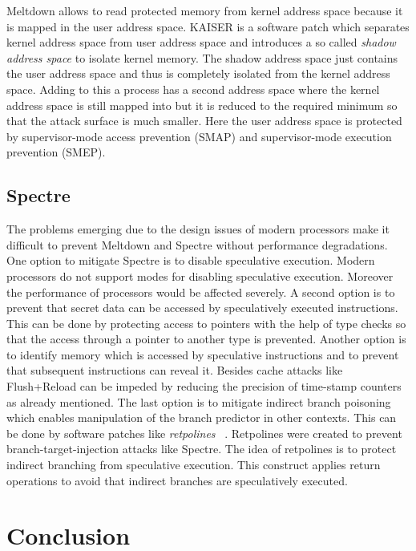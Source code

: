 \documentclass[a4paper,oneside,openright] {scrreprt}
\begin{document}
Meltdown allows to read protected memory from kernel address space because it is mapped in the user address space.
KAISER is a software patch which separates kernel address space from user address space 
and introduces a so called \textit{shadow address space} to isolate kernel memory. 
The shadow address space just contains the user address space and thus is completely isolated from the kernel address space.
Adding to this a process has a second address space where the kernel address space is still mapped into 
but it is reduced to the required minimum so that the attack surface is much smaller. 
Here the user address space is protected by supervisor-mode access prevention (SMAP) 
and supervisor-mode execution prevention (SMEP).

\section{Spectre}
\label{ch:intro:motivation}

The problems emerging due to the design issues of modern processors make it difficult to prevent Meltdown and Spectre 
 without performance degradations.
One option to mitigate Spectre is to disable speculative execution. 
Modern processors do not support modes for disabling speculative execution. 
Moreover the performance of processors would be affected severely.
A second option is to prevent that secret data can be accessed by speculatively executed instructions. 
This can be done by protecting access to pointers with the help of type checks 
so that the access through a pointer to another type is prevented.
Another option is to identify memory which is accessed by speculative instructions and to prevent that subsequent
instructions can reveal it.
Besides cache attacks like Flush+Reload can be impeded by reducing the precision of time-stamp counters as already mentioned.
The last option is to mitigate indirect branch poisoning which enables manipulation of the branch predictor in other contexts.
This can be done by software patches like \textit{retpolines} ~\cite{retpoline}.
Retpolines were created to prevent branch-target-injection attacks like Spectre. 
The idea of retpolines is to protect indirect branching from speculative execution.
This construct applies return operations to avoid that indirect branches are speculatively executed.  

\chapter{Conclusion}
\label{ch:conclusion}
\end{document}
